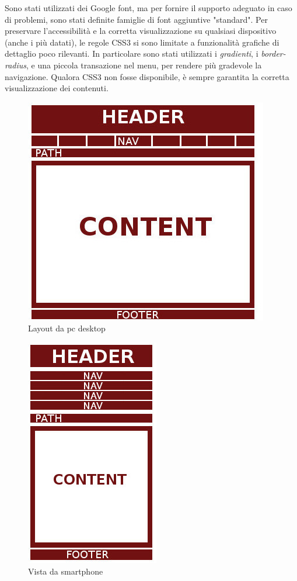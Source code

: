\documentclass[10pt,a4paper,onecolumn]{article}
\begin{document}
Sono stati utilizzati dei Google font, ma per fornire il supporto adeguato in caso di problemi, sono stati definite famiglie di font aggiuntive "standard".
Per preservare l’accessibilità e la corretta visualizzazione su qualsiasi dispositivo (anche i più datati), le regole CSS3 si sono limitate a funzionalità grafiche di dettaglio poco rilevanti. In particolare sono stati utilizzati i \textit{gradienti}, i \textit{border-radius}, e una piccola transazione nel menu, per rendere più gradevole la navigazione. Qualora CSS3 non fosse disponibile, è sempre garantita la corretta visualizzazione dei contenuti.
\begin{figure}[h]
\centering
\includegraphics[scale=0.40]{mock_up.jpg}
\caption{Layout da pc desktop}
\end{figure}
\begin{figure}[h]
\centering
\includegraphics[scale=0.40]{mock_up_mobile.jpg}
\caption{Vista da smartphone}
\end{figure}
\end{document}
